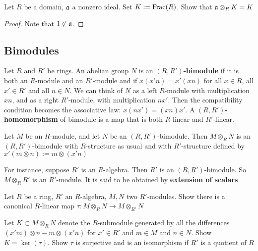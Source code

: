\documentclass[11pt]{article}
\begin{document}
\begin{exercise}
\label{8.6}
Let \(R\) be a domain, \(\mathfrak{a}\) a nonzero ideal. Set \(K:=\operatorname{Frac}(R)\). Show
that \(\mathfrak{a}\otimes_R K=K\)
\end{exercise}

\begin{proof}
Note that \(1\not\in\mathfrak{a}\).
\end{proof}
\subsection*{Bimodules}
\label{sec:orgd67bc4a}
Let \(R\) and \(R'\) be rings. An abelian group \(N\) is an
\textbf{\((R,R')\)-bimodule} if it is both an \(R\)-module and an \(R'\)-module and if
\(x(x'n)=x'(xn)\) for all \(x\in R\), all \(x'\in R'\) and all \(n\in N\). We
can think of \(N\) as a left \(R\)-module with multiplication \(xn\), and as
a right \(R'\)-module, with multiplication \(nx'\). Then the compatibility
condition becomes the associative law: \(x(nx')=(xn)x'\).
A \textbf{\((R,R')\)-homomorphism} of bimodule is a map that is both \(R\)-linear and
\(R'\)-linear.

Let \(M\) be an \(R\)-module, and let \(N\) be an \((R,R')\)-bimodule. Then
\(M\otimes_R N\) is an \((R,R')\)-bimodule with \(R\)-structure as usual and
with \(R'\)-structure defined by \(x'(m\otimes n):=m\otimes (x'n)\)

For instance, suppose \(R'\) is an \(R\)-algebra. Then \(R'\) is an
\((R,R')\)-bimodule. So \(M\otimes_R R'\) is an \(R'\)-module. It is said to
be obtained by \textbf{extension of scalars}

\begin{exercise}
\label{8.8}
Let \(R\) be a ring, \(R'\) an \(R\)-algebra, \(M,N\) two \(R'\)-modules.
Show there is a canonical \(R\)-linear map \(\tau:M\otimes_R N\to
   M\otimes_{R'} N\)

Let \(K\subset M\otimes_R N\) denote the \(R\)-submodule generated by all the
differences \((x'm)\otimes n-m\otimes (x'n)\) for \(x'\in R'\)
and \(m\in
   M\) and \(n\in N\). Show \(K=\ker(\tau)\). Show \(\tau\) is surjective and is an
isomorphism if \(R'\) is a quotient of \(R\)
\end{exercise}
\end{document}
